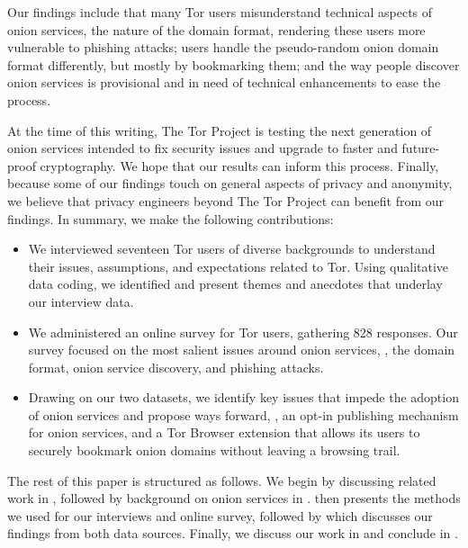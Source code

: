 Our findings include that \first many Tor users misunderstand technical aspects
of onion services, \eg the nature of the domain format, rendering these users
more vulnerable to phishing attacks; \second users handle the pseudo-random
onion domain format differently, but mostly by bookmarking them; and \third the
way people discover onion services is provisional and in need of technical
enhancements to ease the process.

At the time of this writing, The Tor Project is testing the next generation of
onion services intended to fix security issues and upgrade to faster and
future-proof cryptography.  We hope that our results can inform this process.
Finally, because some of our findings touch on general aspects of privacy and
anonymity, we believe that privacy engineers beyond The Tor Project can benefit
from our findings.  In summary, we make the following contributions:

\begin{itemize}
    \item We interviewed seventeen Tor users of diverse backgrounds to
        understand their issues, assumptions, and expectations related to Tor.
        Using qualitative data coding, we identified and present themes and
        anecdotes that underlay our interview data.

    \item We administered an online survey for Tor users, gathering 828
        responses.  Our survey focused on the most salient issues around onion
        services, \ie, the domain format, onion service discovery, and phishing
        attacks.

    \item Drawing on our two datasets, we identify key issues that impede the
        adoption of onion services and propose ways forward, \eg, an opt-in
        publishing mechanism for onion services, and a Tor Browser extension
        that allows its users to securely bookmark onion domains without leaving
        a browsing trail.
\end{itemize}

The rest of this paper is structured as follows.  We begin by discussing related
work in , followed by background on onion services in
.   then presents the methods we used for
our interviews and online survey, followed by  which discusses
our findings from both data sources.  Finally, we discuss our work in
 and conclude in .
